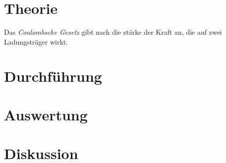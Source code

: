 \documentclass[12pt,a4paper,titlepage,headinclude,bibtotoc]{scrartcl}
\begin{document}
\section{Theorie}
\label{sec:theorie}
Das \emph{Coulombsche Gesetz} gibt nach \cite[S. 2]{demtroeder2} die stärke der Kraft an, die auf zwei Ladungsträger wirkt.


\section{Durchführung}
\label{sec:durchfuehrung}

\section{Auswertung}
\label{sec:auswertung}

\section{Diskussion}
\label{sec:diskussion}



\end{document}
